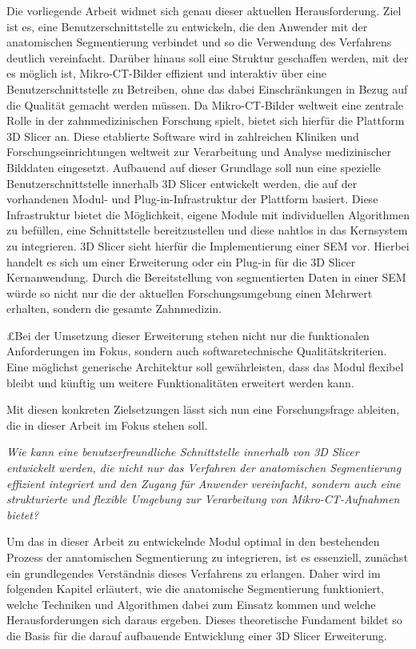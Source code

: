 Die vorliegende Arbeit widmet sich genau dieser aktuellen Herausforderung. Ziel
ist es, eine Benutzerschnittstelle zu entwickeln, die den Anwender mit der
anatomischen Segmentierung verbindet und so die Verwendung des Verfahrens
deutlich vereinfacht. Darüber hinaus soll eine Struktur geschaffen werden, mit
der es möglich ist, Mikro-CT-Bilder effizient und interaktiv über eine Benutzerschnittstelle
zu Betreiben, ohne das dabei Einschränkungen in Bezug auf die Qualität gemacht
werden müssen. Da Mikro-\ac{CT}-Bilder weltweit eine zentrale Rolle in der
zahnmedizinischen Forschung spielt, bietet sich hierfür die Plattform 3D Slicer an.
Diese etablierte Software wird in zahlreichen Kliniken und
Forschungseinrichtungen weltweit zur Verarbeitung und Analyse medizinischer
Bilddaten eingesetzt. Aufbauend auf dieser Grundlage soll nun eine spezielle Benutzerschnittstelle
innerhalb 3D Slicer entwickelt werden, die auf der vorhandenen Modul- und Plug-in-Infrastruktur
der Plattform basiert. Diese Infrastruktur bietet die Möglichkeit, eigene Module
mit individuellen Algorithmen zu befüllen, eine Schnittstelle bereitzustellen
und diese nahtlos in das Kernsystem zu integrieren. 3D Slicer sieht hierfür die Implementierung
einer \ac{SEM} vor. Hierbei handelt es sich um einer Erweiterung oder ein Plug-in
für die 3D Slicer Kernanwendung. Durch die Bereitstellung von segmentierten
Daten in einer \ac{SEM} würde so nicht nur die der aktuellen Forschungsumgebung einen
Mehrwert erhalten, sondern die gesamte Zahnmedizin.

£Bei der Umsetzung dieser Erweiterung stehen nicht nur die funktionalen
Anforderungen im Fokus, sondern auch softwaretechnische Qualitätskriterien. Eine
möglichst generische Architektur soll gewährleisten, dass das Modul flexibel bleibt
und künftig um weitere Funktionalitäten erweitert werden kann.

Mit diesen konkreten Zielsetzungen lässt sich nun eine Forschungsfrage ableiten,
die in dieser Arbeit im Fokus stehen soll.

\begin{center}
	\textit{Wie kann eine benutzerfreundliche Schnittstelle innerhalb von 3D
	Slicer entwickelt werden, die nicht nur das Verfahren der anatomischen Segmentierung
	effizient integriert und den Zugang für Anwender vereinfacht, sondern auch
	eine strukturierte und flexible Umgebung zur Verarbeitung von Mikro-CT-Aufnahmen
	bietet?}
\end{center}

Um das in dieser Arbeit zu entwickelnde Modul optimal in den bestehenden Prozess
der anatomischen Segmentierung zu integrieren, ist es essenziell, zunächst ein grundlegendes
Verständnis dieses Verfahrens zu erlangen. Daher wird im folgenden Kapitel
erläutert, wie die anatomische Segmentierung funktioniert, welche Techniken und
Algorithmen dabei zum Einsatz kommen und welche Herausforderungen sich daraus
ergeben. Dieses theoretische Fundament bildet so die Basis für die darauf aufbauende
Entwicklung einer 3D Slicer Erweiterung.
